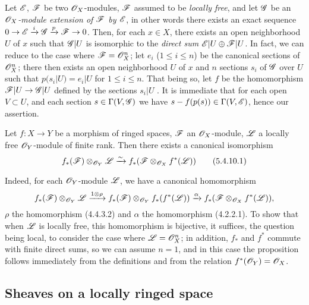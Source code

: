 \begin{env}[5.4.9]
\label{0.5.4.9}
Let $\mathscr{E}$, $\mathscr{F}$ be two $\mathscr{O}_X$-modules, $\mathscr{F}$ assumed to be
{\em locally free}, and let $\mathscr{G}$ be an {\em $\mathscr{O}_X$-module extension of
$\mathscr{F}$ by $\mathscr{E}$}, in other words there exists an exact sequence
$0\to\mathscr{E}\xrightarrow{i}\mathscr{G}\xrightarrow{p}\mathscr{F}\to 0$. Then, for each
$x\in X$, there exists an open neighborhood $U$ of $x$ such that $\mathscr{G}|U$ is
isomorphic to the {\em direct sum $\mathscr{E}|U\oplus\mathscr{F}|U$}. In fact, we can
reduce to the case where $\mathscr{F}=\mathscr{O}_X^n$; let $e_i$ ($1\leqslant i\leqslant n$)
be the canonical sections  of $\mathscr{O}_X^n$; there then exists an
open neighborhood $U$ of $x$ and $n$ sections $s_i$ of $\mathscr{G}$ over $U$ such
that $p(s_i|U)=e_i|U$ for $1\leqslant i\leqslant n$. That being so, let $f$ be
the homomorphism $\mathscr{F}|U\to\mathscr{G}|U$ defined by the sections $s_i|U$
. It is immediate that for each open $V\subset U$, and each
section $s\in\Gamma(V,\mathscr{G})$ we have $s-f(p(s))\in\Gamma(V,\mathscr{E})$, hence our
assertion.
\end{env}

\begin{env}[5.4.10]
\label{0.5.4.10}
Let $f:X\to Y$ be a morphism of ringed spaces, $\mathscr{F}$ an $\mathscr{O}_X$-module,
$\mathscr{L}$ a locally free $\mathscr{O}_Y$-module of finite rank. Then there exists a
canonical isomorphism
\[
  f_*(\mathscr{F})\otimes_{\mathscr{O}_Y}\mathscr{L}\xrightarrow{\sim} f_*(\mathscr{F}\otimes_{\mathscr{O}_X}f^*(\mathscr{L}))
  \tag{5.4.10.1}
\]

Indeed, for each $\mathscr{O}_Y$-module $\mathscr{L}$, we have a canonical homomorphism
\[
  f_*(\mathscr{F})\otimes_{\mathscr{O}_Y}\mathscr{L}
  \xrightarrow{1\otimes\rho}f_*(\mathscr{F})\otimes_{\mathscr{O}_Y}f_*(f^*(\mathscr{L}))
  \xrightarrow{\alpha}f_*(\mathscr{F}\otimes_{\mathscr{O}_X}f^*(\mathscr{L})),
\]
$\rho$ the homomorphism (4.4.3.2) and $\alpha$ the homomorphism (4.2.2.1). To
show that when $\mathscr{L}$ is locally free, this homomorphism is bijective, it
suffices, the question being local, to consider the case where $\mathscr{L}=\mathscr{O}_X^n$;
in addition, $f_*$ and $f^*$ commute with finite direct sums, so we can assume
$n=1$, and in this case the proposition follows immediately from the definitions
and from the relation $f^*(\mathscr{O}_Y)=\mathscr{O}_X$.
\end{env}

\subsection{Sheaves on a locally ringed space}
\label{subsection-sheaves-on-lrs}

